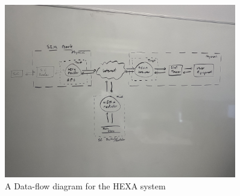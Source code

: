 
\begin{figure}[ht!]
    \centering
    \includegraphics[width=0.9\textwidth]{images/dfd}
    \caption{A Data-flow diagram for the HEXA system}
    \label{fig:dfd}
\end{figure}
